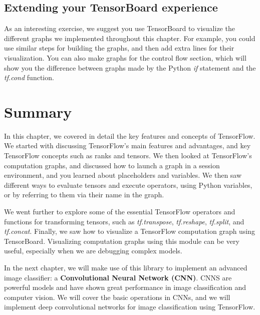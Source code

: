 \documentclass[11pt]{article}
\begin{document}
    \subsection{Extending your TensorBoard
experience}\label{extending-your-tensorboard-experience}

    As an interesting exercise, we suggest you use TensorBoard to visualize
the different graphs we implemented throughout this chapter. For
example, you could use similar steps for building the graphs, and then
add extra lines for their visualization. You can also make graphs for
the control flow section, which will show you the difference between
graphs made by the Python \emph{if} statement and the \emph{tf.cond}
function.

    \section{Summary}\label{summary}

    In this chapter, we covered in detail the key features and concepts of
TensorFlow. We started with discussing TensorFlow's main features and
advantages, and key TensorFlow concepts such as ranks and tensors. We
then looked at TensorFlow's computation graphs, and discussed how to
launch a graph in a session environment, and you learned about
placeholders and variables. We then saw different ways to evaluate
tensors and execute operators, using Python variables, or by referring
to them via their name in the graph.

We went further to explore some of the essential TensorFlow operators
and functions for transforming tensors, such as \emph{tf.transpose},
\emph{tf.reshape}, \emph{tf.split}, and \emph{tf.concat}. Finally, we
saw how to visualize a TensorFlow computation graph using TensorBoard.
Visualizing computation graphs using this module can be very useful,
especially when we are debugging complex models.

In the next chapter, we will make use of this library to implement an
advanced image classifier: a \textbf{Convolutional Neural Network
(CNN)}. CNNS are powerful models and have shown great performance in
image classification and computer vision. We will cover the basic
operations in CNNs, and we will implement deep convolutional networks
for image classification using TensorFlow.


    
    
    
    
\end{document}
